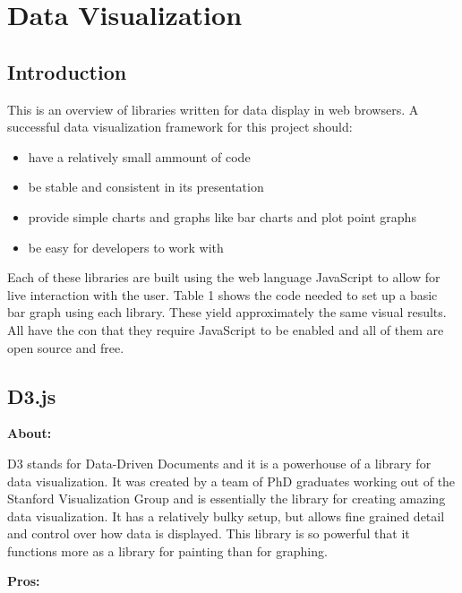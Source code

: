 \documentclass[draftclsnofoot,onecolumn,letterpaper,10pt,compsoc]{IEEEtran}
\begin{document}
\section{Data Visualization}
  \subsection{Introduction}
  This is an overview of libraries written for data display in web browsers.
  A successful data visualization framework for this project should:
  \begin{itemize}
    \item have a relatively small ammount of code
    \item be stable and consistent in its presentation
    \item provide simple charts and graphs like bar charts and plot point graphs
    \item be easy for developers to work with
  \end{itemize}
  Each of these libraries are built using the web language JavaScript to allow for live interaction with the user.
  Table 1 shows the code needed to set up a basic bar graph using each library.
  These yield approximately the same visual results.
  All have the con that they require JavaScript to be enabled and all of them are open source and free.

  \subsection{D3.js}
  \textbf{About:}

  D3 stands for Data-Driven Documents and it is a powerhouse of a library for data visualization.\cite{d3.org}
  It was created by a team of PhD graduates working out of the Stanford Visualization Group and is essentially the library for creating amazing data visualization.\cite{d3Journal}
  It has a relatively bulky setup, but allows fine grained detail and control over how data is displayed.
  This library is so powerful that it functions more as a library for painting than for graphing.

  \textbf{Pros:}
\end{document}
